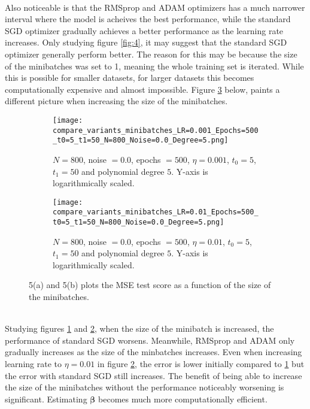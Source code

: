 \documentclass[a4paper,twocolumn]{article}
\newcommand{\B}{\boldsymbol{\beta}}
\begin{document}
\\
Also noticeable is that the RMSprop and ADAM optimizers has a much narrower interval where the model is acheives the best performance, while the standard SGD optimizer gradually achieves a better performance as the learning rate increases. Only studying figure \ref{fig:4}, it may suggest that the standard SGD optimizer generally perform better. The reason for this may be because the size of the minibatches was set to 1, meaning the whole training set is iterated. While this is possible for smaller datasets, for larger datasets this becomes computationally expensive and almost impossible. Figure \ref{fig:5} below, paints a different picture when increasing the size of the minibatches.
\begin{figure}[ht]
    \centering
    \begin{subfigure}[b]{0.9\columnwidth}
        \texttt{[image: compare\_variants\_minibatches\_LR=0.001\_Epochs=500\_t0=5\_t1=50\_N=800\_Noise=0.0\_Degree=5.png]}
        \caption{$N = 800$, noise $= 0.0$, epochs $= 500$, $\eta = 0.001$, $t_{0} = 5$, $t_{1} = 50$ and polynomial degree $5$. Y-axis is logarithmically scaled.}
        \label{fig:5a}
    \end{subfigure}
    
    \begin{subfigure}[b]{0.9\columnwidth}
        \texttt{[image: compare\_variants\_minibatches\_LR=0.01\_Epochs=500\_t0=5\_t1=50\_N=800\_Noise=0.0\_Degree=5.png]}
        \caption{$N = 800$, noise $= 0.0$, epochs $= 500$, $\eta = 0.01$, $t_{0} = 5$, $t_{1} = 50$ and polynomial degree $5$. Y-axis is logarithmically scaled.}
        \label{fig:5b}
    \end{subfigure}
    \caption{5(a) and 5(b) plots the MSE test score as a function of the size of the minibatches.}
    \label{fig:5}
\end{figure}\\
Studying figures \ref{fig:5a} and \ref{fig:5b}, when the size of the minibatch is increased, the performance of standard SGD worsens. Meanwhile, RMSprop and ADAM only gradually increases as the size of the minbatches increases. Even when increasing learning rate to $\eta = 0.01$ in figure \ref{fig:5b}, the error is lower initially compared to \ref{fig:5a} but the error with standard SGD still increases. The benefit of being able to increase the size of the minibatches without the performance noticeably worsening is significant. Estimating $\B$ becomes much more computationally efficient.\\
\end{document}
